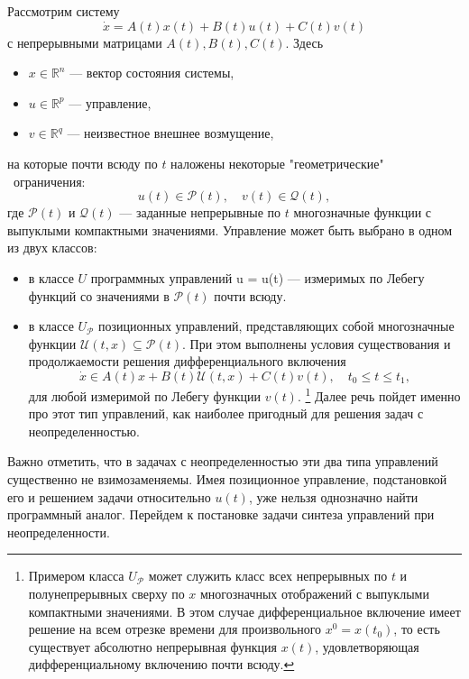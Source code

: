 Рассмотрим систему
\begin{equation}\label{problem}
    \dot{x} = A(t)x(t) + B(t)u(t) + C(t)v(t)
\end{equation}
с непрерывными матрицами \( A(t), B(t), C(t) \). 
Здесь 
\begin{itemize}
    \item \( x \in \mathbb{R}^n \) --- вектор состояния системы, 
    \item \( u \in \mathbb{R}^p \) --- управление, 
    \item \( v \in \mathbb{R}^q \) --- неизвестное внешнее возмущение,
\end{itemize}
на которые почти всюду по \( t \) наложены некоторые "геометрические"  \ 
 ограничения:
\begin{equation}\label{problem_bounds}
    u(t) \in \mathcal{P}(t), \quad v(t) \in \mathcal{Q}(t),
\end{equation}
 где \( \mathcal{P}(t) \) и \( \mathcal{Q}(t) \) --- заданные непрерывные по \( t \) 
 многозначные функции с выпуклыми компактными значениями. 
Управление может быть выбрано в одном из двух классов:
\begin{itemize}
    \item в классе \( U \) программных управлений u = u(t) --- измеримых по
     Лебегу функций со значениями в \( \mathcal{P}(t) \) почти всюду.
    \item в классе \( U_\mathcal{P} \) позиционных управлений, представляющих
     собой многозначные функции \( \mathcal{U}(t,x) \subseteq
     \mathcal{P}(t) \). При этом выполнены условия существования и
     продолжаемости решения дифференциального включения
    \begin{equation}\label{dif_inclusion}
        \dot{x} \in A(t)x + B(t)\mathcal{U}(t,x) + C(t)v(t), \quad
         t_0 \le t \le t_1, 
    \end{equation}
    для любой измеримой по Лебегу функции \( v(t) \). \footnote{Примером класса
     \( U_\mathcal{P} \) может служить класс всех непрерывных по \( t \) и
     полунепрерывных сверху по \( x \) многозначных отображений с выпуклыми
     компактными значениями. В этом случае дифференциальное включение имеет
     решение на всем отрезке времени для произвольного \( x^0 = x(t_0) \),
     то есть существует абсолютно непрерывная функция \( x(t) \),
     удовлетворяющая дифференциальному включению почти всюду.} Далее речь пойдет
     именно про этот тип управлений, как наиболее пригодный для решения задач с 
     неопределенностью.
\end{itemize}
Важно отметить, что в задачах с неопределенностью эти два типа управлений
 существенно не взимозаменяемы. Имея позиционное управление, подстановкой его
 и решением задачи относительно \( u(t) \), уже нельзя однозначно найти
 программный аналог. Перейдем к постановке задачи синтеза управлений при 
 неопределенности.

